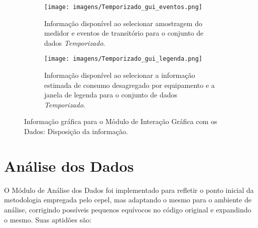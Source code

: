 \begin{figure*}[p!]
  \begin{center}
    \begin{subfigure}[c]{\textwidth}
      \texttt{[image: imagens/Temporizado\_gui\_eventos.png]}
      \caption{Informação disponível ao selecionar amostragem do
medidor e eventos de transitório para o conjunto de dados \emph{Temporizado}.}
      \label{fig:temporizado_gui_eventos}
    \end{subfigure}
    \hfill
    \begin{subfigure}[c]{\textwidth}
      \texttt{[image: imagens/Temporizado\_gui\_legenda.png]}
      \caption{Informação disponível ao selecionar a informação
estimada de consumo desagregado por equipamento e a janela de legenda
para o conjunto de dados \emph{Temporizado}.}
      \label{fig:temporizado_gui_legenda}
    \end{subfigure}
  \end{center}
\caption{Informação gráfica para o Módulo de Interação Gráfica com os
Dados: Disposição da informação.}
\label{fig:gui_informacao} \end{figure*}



\section{Análise dos Dados}
\label{sec:analise}

O Módulo de Análise dos Dados foi implementado para refletir o ponto
inicial da metodologia empregada pelo \acs{cepel}, mas adaptando o
mesmo para o ambiente de análise, corrigindo possíveis pequenos
equívocos no código original e expandindo o mesmo. Suas aptidões
são:

